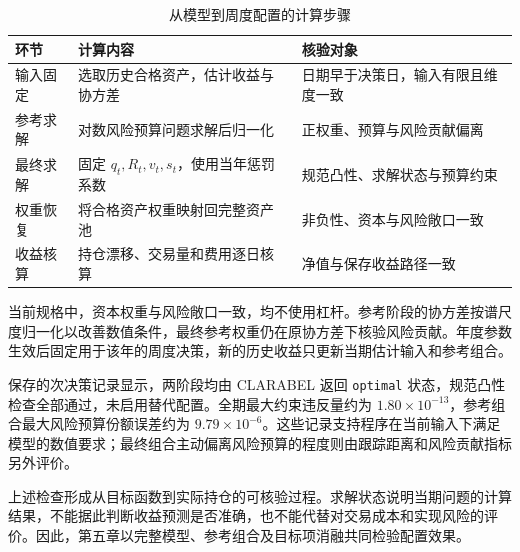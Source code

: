 \begin{table}[htbp]\centering
\caption{从模型到周度配置的计算步骤}\label{tab:solver_workflow}
\begin{tabularx}{\textwidth}{@{}p{2.3cm} L L@{}}
\toprule 环节 & 计算内容 & 核验对象\\\midrule
输入固定 & 选取历史合格资产，估计收益与协方差 & 日期早于决策日，输入有限且维度一致\\
参考求解 & 对数风险预算问题求解后归一化 & 正权重、预算与风险贡献偏离\\
最终求解 & 固定 $q_t,R_t,v_t,s_t$，使用当年惩罚系数 & 规范凸性、求解状态与预算约束\\
权重恢复 & 将合格资产权重映射回完整资产池 & 非负性、资本与风险敞口一致\\
收益核算 & 持仓漂移、交易量和费用逐日核算 & 净值与保存收益路径一致\\
\bottomrule
\end{tabularx}
\end{table}

当前规格中，资本权重与风险敞口一致，均不使用杠杆。参考阶段的协方差按谱尺度归一化以改善数值条件，最终参考权重仍在原协方差下核验风险贡献。年度参数生效后固定用于该年的周度决策，新的历史收益只更新当期估计输入和参考组合。

保存的\primaryRebalances{}次决策记录显示，两阶段均由 CLARABEL 返回 \texttt{optimal} 状态，规范凸性检查全部通过，未启用替代配置。全期最大约束违反量约为 $1.80\times10^{-13}$，参考组合最大风险预算份额误差约为 $9.79\times10^{-6}$。这些记录支持程序在当前输入下满足模型的数值要求；最终组合主动偏离风险预算的程度则由跟踪距离和风险贡献指标另外评价。

上述检查形成从目标函数到实际持仓的可核验过程。求解状态说明当期问题的计算结果，不能据此判断收益预测是否准确，也不能代替对交易成本和实现风险的评价。因此，第五章以完整模型、参考组合及目标项消融共同检验配置效果。
